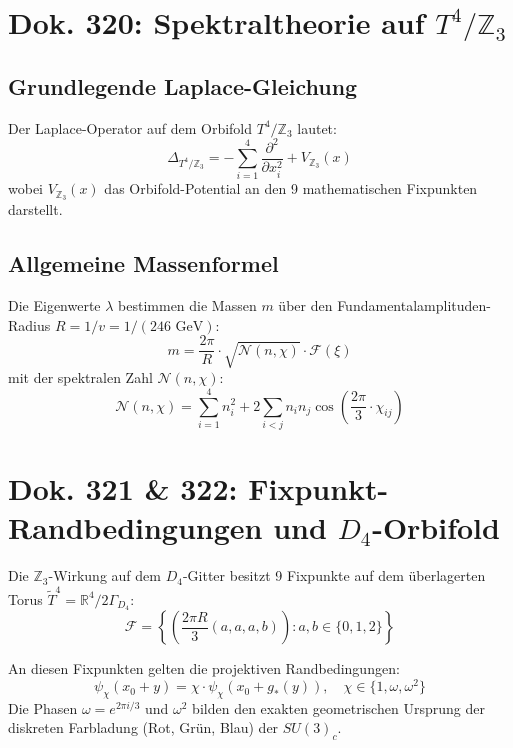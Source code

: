 \documentclass[11pt,a4paper]{article}
\begin{document}
	\section{Dok. 320: Spektraltheorie auf $T^4/\mathbb{Z}_3$}
	
	\subsection{Grundlegende Laplace-Gleichung}
	Der Laplace-Operator auf dem Orbifold $T^4/\mathbb{Z}_3$ lautet:
	\begin{equation}
		\Delta_{T^4/\mathbb{Z}_3} = -\sum_{i=1}^4 \frac{\partial^2}{\partial x_i^2} + V_{\mathbb{Z}_3}(x)
	\end{equation}
	wobei $V_{\mathbb{Z}_3}(x)$ das Orbifold-Potential an den 9 mathematischen Fixpunkten darstellt.
	
	\subsection{Allgemeine Massenformel}
	Die Eigenwerte $\lambda$ bestimmen die Massen $m$ über den Fundamentalamplituden-Radius $R = 1/v = 1/(246\text{ GeV})$:
	\begin{equation}
		m = \frac{2\pi}{R} \cdot \sqrt{\mathcal{N}(n, \chi)} \cdot \mathcal{F}(\xi)
	\end{equation}
	mit der spektralen Zahl $\mathcal{N}(n, \chi)$:
	\begin{equation}
		\mathcal{N}(n, \chi) = \sum_{i=1}^4 n_i^2 + 2\sum_{i<j} n_i n_j \cos\left(\frac{2\pi}{3} \cdot \chi_{ij}\right)
	\end{equation}
	
	\section{Dok. 321 \& 322: Fixpunkt-Randbedingungen und $D_4$-Orbifold}
	
	Die $\mathbb{Z}_3$-Wirkung auf dem $D_4$-Gitter besitzt 9 Fixpunkte auf dem überlagerten Torus $\tilde{T}^4 = \mathbb{R}^4/2\Gamma_{D_4}$:
	\begin{equation}
		\mathcal{F} = \left\{ \left( \frac{2\pi R}{3} (a, a, a, b) \right) : a, b \in \{0, 1, 2\} \right\}
	\end{equation}
	
	An diesen Fixpunkten gelten die projektiven Randbedingungen:
	\begin{equation}
		\psi_{\chi}(x_0 + y) = \chi \cdot \psi_{\chi}(x_0 + g_*(y)), \quad \chi \in \{1, \omega, \omega^2\}
	\end{equation}
	Die Phasen $\omega = e^{2\pi i / 3}$ und $\omega^2$ bilden den exakten geometrischen Ursprung der diskreten Farbladung (Rot, Grün, Blau) der $SU(3)_c$.
	
\end{document}
